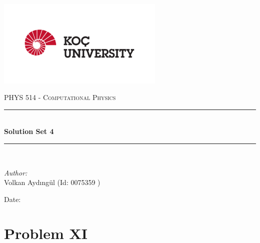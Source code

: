\documentclass[letterpaper,12pt]{article}
\newcommand{\reporttitle}{Solution Set 4}
\newcommand{\reportauthor}{ Volkan Aydıngül (Id: 0075359 )\\
                            }
\begin{document}
\begin{titlepage}
\newcommand{\HRule}{\rule{\linewidth}{0.5mm}}
\begin{center} %
\includegraphics[width = 8cm]{figures/koc_logo.png}

\textsc{\Large PHYS 514 - Computational Physics}\\[1.5cm] 
\HRule \\[0.6cm]
{ \huge \bfseries \reporttitle}\\ %
\HRule \\[1.5cm]
\end{center}
\vspace{2cm}
\begin{flushleft} \large
\textit{Author:}\\
\reportauthor%
\end{flushleft}
\vspace{2cm}
\makeatletter
Date: \@date 
\vfill %
\makeatother
\end{titlepage}




\tableofcontents
\newpage






\section{Problem XI}
\end{document}
